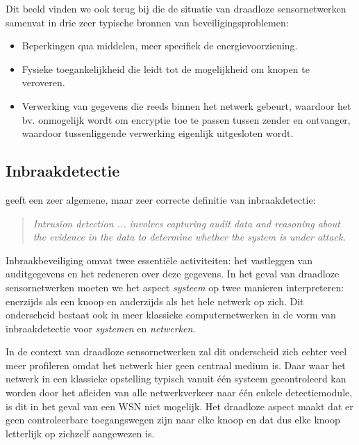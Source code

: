 Dit beeld vinden we ook terug bij \citep{aschenbruck2012security} die de
situatie van draadloze sensornetwerken samenvat in drie zeer typische bronnen
van beveiligingsproblemen:

\begin{itemize}[noitemsep, topsep=0pt, partopsep=0pt]

  \item{Beperkingen qua middelen, meer specifiek de energievoorziening.}
  
  \item{Fysieke toegankelijkheid die leidt tot de mogelijkheid om knopen te
  veroveren.}

  \item{Verwerking van gegevens die reeds binnen het netwerk gebeurt, waardoor
  het bv. onmogelijk wordt om encryptie toe te passen tussen zender en
  ontvanger, waardoor tussenliggende verwerking eigenlijk uitgesloten wordt.}

\end{itemize}

\subsection{Inbraakdetectie}

\citep{zhang2000intrusion} geeft een zeer algemene, maar zeer correcte
definitie van inbraakdetectie:

\vspace{-2mm}

\begin{quote}
\emph{Intrusion detection ... involves capturing audit data and reasoning about
the evidence in the data to determine whether the system is under attack.}
\end{quote}

\vspace{-2mm}

Inbraakbeveiliging omvat twee essenti\"ele activiteiten: het vastleggen van
auditgegevens en het redeneren over deze gegevens. In het geval van draadloze
sensornetwerken moeten we het aspect \emph{systeem} op twee manieren
interpreteren: enerzijds als een knoop en anderzijds als het hele netwerk op
zich. Dit onderscheid bestaat ook in meer klassieke computernetwerken in de
vorm van inbraakdetectie voor \emph{systemen} en \emph{netwerken}.

In de context van draadloze sensornetwerken zal dit onderscheid zich echter
veel meer profileren omdat het netwerk hier geen centraal medium is. Daar waar
het netwerk in een klassieke opstelling typisch vanuit \'e\'en systeem
gecontroleerd kan worden door het afleiden van alle netwerkverkeer naar \'e\'en
enkele detectiemodule, is dit in het geval van een WSN niet mogelijk. Het
draadloze aspect maakt dat er geen controleerbare toegangswegen zijn naar elke
knoop en dat dus elke knoop letterlijk op zichzelf aangewezen is.

